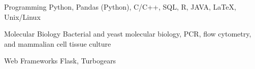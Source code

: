 

\begin{cvskills}

  \cvskill
  {Programming} %
  {Python, Pandas (Python), C/C++, SQL, R, JAVA, LaTeX, Unix/Linux} %


  \cvskill
  {Molecular Biology} %
  {Bacterial and yeast molecular biology, PCR, flow cytometry, and mammalian cell tissue culture} %

  \cvskill
  {Web Frameworks} %
  {Flask, Turbogears} %

\end{cvskills}
